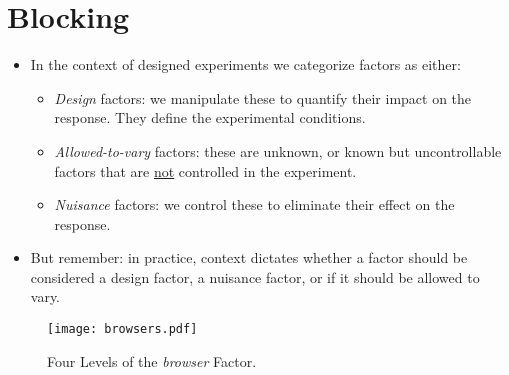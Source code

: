 \chapter{Blocking}
\begin{itemize}
      \item In the context of designed experiments we categorize factors as either:
            \begin{itemize}
                  \item \emph{Design} factors: we manipulate these to quantify their impact on the response.
                        They define the experimental conditions.
                  \item \emph{Allowed-to-vary} factors: these are unknown, or known but uncontrollable
                        factors that are \underline{not} controlled in the experiment.
                  \item \emph{Nuisance} factors: we control these to eliminate their effect on the response.
            \end{itemize}
      \item But remember: in practice, context dictates whether a factor should be considered a design factor, a
            nuisance factor, or if it should be allowed to vary.
\end{itemize}
\begin{figure}[!htbp]
      \centering
      \texttt{[image: browsers.pdf]}
      \caption{Four Levels of the \emph{browser} Factor.}
\end{figure}
